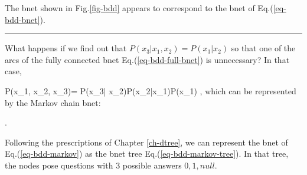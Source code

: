 The bnet shown in
Fig.\ref{fig-bdd}
appears to 
correspond to
the bnet of
Eq.(\ref{eq-bdd-bnet}).

\beq
{}
\label{eq-bdd-bnet}
\eeq

\hrule
What happens
if we find out that
$P(x_3|x_1, x_2)=P(x_3|x_2)$ so that
one of the arcs of the
fully connected bnet Eq.(\ref{eq-bdd-full-bnet})
is unnecessary?
In that case,

\beq
P(x_1, x_2, x_3)=
P(x_3| x_2)P(x_2|x_1)P(x_1)
\;,
\eeq
which can be represented by the 
Markov chain bnet:

\beq
{}
\;.
\label{eq-bdd-markov}
\eeq

Following the prescriptions
of Chapter \ref{ch-dtree}, we
can represent
the bnet
of Eq.(\ref{eq-bdd-markov})
as the bnet tree 
Eq.(\ref{eq-bdd-markov-tree}).
In that tree,
the nodes
pose questions
with 3 possible answers $0,1,null$.

\beq
{}
\label{eq-bdd-markov-tree}
\eeq



